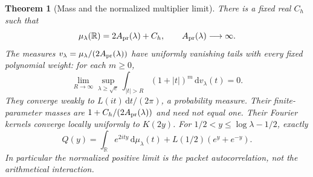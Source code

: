 \documentclass[11pt]{article}
\newtheorem{theorem}{Theorem}
\theoremstyle{remark}\newtheorem{remark}[theorem]{Remark}
\newcommand{\R}{\mathbb R}
\newcommand{\dd}{\,\mathrm d}
\begin{document}
\begin{theorem}[Mass and the normalized multiplier limit]
\label{thm:multiplier-limit}
There is a fixed real $C_h$ such that
\[
 \mu_\lambda(\R)=2A_{\rm pr}(\lambda)+C_h,\qquad
 A_{\rm pr}(\lambda)\longrightarrow\infty .
\]
The measures $v_\lambda=\mu_\lambda/(2A_{\rm pr}(\lambda))$
have uniformly vanishing tails with every fixed polynomial weight:
for each $m\ge0$,
\[
 \lim_{R\to\infty}\sup_{\lambda\ge\sqrt e}
   \int_{|t|>R}(1+|t|)^m\dd v_\lambda(t)=0.
\]
They converge weakly to
$L(it)\dd t/(2\pi)$, a probability measure.
Their finite-parameter masses are
$1+C_h/(2A_{\rm pr}(\lambda))$ and need not equal one.
Their Fourier
kernels converge locally uniformly to $K(2y)$.
For $1/2<y\le\log\lambda-1/2$, exactly
\[
 Q(y)=\int_\R e^{2ity}\dd\mu_\lambda(t)
                         +L(1/2)(e^y+e^{-y}).
 \tag{MNL}
\]
In particular the normalized positive limit is the packet
autocorrelation, not the arithmetical interaction.
\end{theorem}
\end{document}
